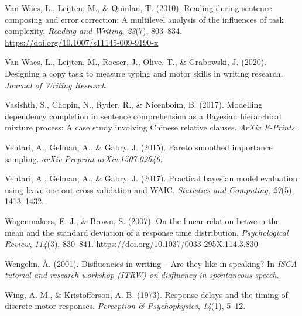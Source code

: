 \documentclass[english,jou,floatsintext]{apa7}
\begin{document}
\leavevmode\hypertarget{ref-van2010reading}{}%
Van Waes, L., Leijten, M., \& Quinlan, T. (2010). Reading during sentence composing and error correction: A multilevel analysis of the influences of task complexity. \emph{Reading and Writing}, \emph{23}(7), 803--834. \url{https://doi.org/10.1007/s11145-009-9190-x}

\leavevmode\hypertarget{ref-waes2019}{}%
Van Waes, L., Leijten, M., Roeser, J., Olive, T., \& Grabowski, J. (2020). Designing a copy task to measure typing and motor skills in writing research. \emph{Journal of Writing Research}.

\leavevmode\hypertarget{ref-vasishth2017}{}%
Vasishth, S., Chopin, N., Ryder, R., \& Nicenboim, B. (2017). Modelling dependency completion in sentence comprehension as a Bayesian hierarchical mixture process: A case study involving Chinese relative clauses. \emph{ArXiv E-Prints}.

\leavevmode\hypertarget{ref-vehtari2015pareto}{}%
Vehtari, A., Gelman, A., \& Gabry, J. (2015). Pareto smoothed importance sampling. \emph{arXiv Preprint arXiv:1507.02646}.

\leavevmode\hypertarget{ref-vehtari2017practical}{}%
Vehtari, A., Gelman, A., \& Gabry, J. (2017). Practical bayesian model evaluation using leave-one-out cross-validation and WAIC. \emph{Statistics and Computing}, \emph{27}(5), 1413--1432.

\leavevmode\hypertarget{ref-wagenmakers2007linear}{}%
Wagenmakers, E.-J., \& Brown, S. (2007). On the linear relation between the mean and the standard deviation of a response time distribution. \emph{Psychological Review}, \emph{114}(3), 830--841. \url{https://doi.org/10.1037/0033-295X.114.3.830}

\leavevmode\hypertarget{ref-wengelin2001disfluencies}{}%
Wengelin, Å. (2001). Disfluencies in writing -- Are they like in speaking? In \emph{ISCA tutorial and research workshop (ITRW) on disfluency in spontaneous speech}.

\leavevmode\hypertarget{ref-wing1973response}{}%
Wing, A. M., \& Kristofferson, A. B. (1973). Response delays and the timing of discrete motor responses. \emph{Perception \& Psychophysics}, \emph{14}(1), 5--12.
\end{document}
